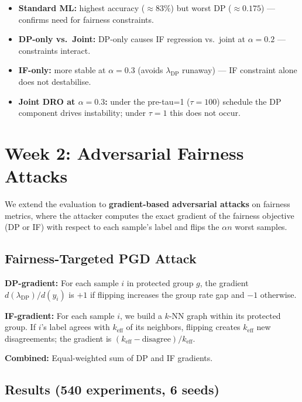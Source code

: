 \documentclass[11pt,a4paper]{article}
\newcommand{\lDP}{\lambda_{\mathrm{DP}}}
\begin{document}
\begin{itemize}
\item \textbf{Standard ML:} highest accuracy ($\approx83\%$) but worst DP
  ($\approx0.175$) --- confirms need for fairness constraints.
\item \textbf{DP-only vs.\ Joint:} DP-only causes IF regression vs.\ joint at
  $\alpha=0.2$ --- constraints interact.
\item \textbf{IF-only:} more stable at $\alpha=0.3$ (avoids $\lDP$ runaway)
  --- IF constraint alone does not destabilise.
\item \textbf{Joint DRO at $\alpha=0.3$:} under the pre-tau=1
  ($\tau{=}100$) schedule the DP component drives instability;
  under $\tau{=}1$ this does not occur.
\end{itemize}

\section{Week 2: Adversarial Fairness Attacks}

We extend the evaluation to \textbf{gradient-based adversarial attacks} on
fairness metrics, where the attacker computes the exact gradient of the
fairness objective (DP or IF) with respect to each sample's label and flips
the $\alpha n$ worst samples.

\subsection{Fairness-Targeted PGD Attack}

\textbf{DP-gradient:} For each sample $i$ in protected group $g$, the
gradient $d(\lDP)/d(y_i)$ is $+1$ if flipping increases the group rate gap
and $-1$ otherwise.

\textbf{IF-gradient:} For each sample $i$, we build a $k$-NN graph within
its protected group.  If $i$'s label agrees with $k_{\text{eff}}$ of its
neighbors, flipping creates $k_{\text{eff}}$ new disagreements; the gradient
is $(k_{\text{eff}} - \text{disagree}) / k_{\text{eff}}$.

\textbf{Combined:} Equal-weighted sum of DP and IF gradients.

\subsection{Results (540 experiments, 6 seeds)}
\end{document}
